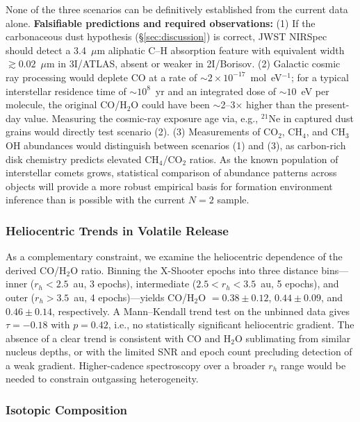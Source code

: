 \documentclass[preprint2]{aastex631}
\begin{document}
None of the three scenarios can be definitively established from the current data alone. \textbf{Falsifiable predictions and required observations:} (1) If the carbonaceous dust hypothesis (§\ref{sec:discussion}) is correct, JWST NIRSpec should detect a 3.4~$\mu$m aliphatic C--H absorption feature with equivalent width $\gtrsim 0.02$~$\mu$m in 3I/ATLAS, absent or weaker in 2I/Borisov. (2) Galactic cosmic ray processing \citep{gerakines01} would deplete CO at a rate of $\sim 2 \times 10^{-17}$~mol~eV$^{-1}$; for a typical interstellar residence time of $\sim 10^8$~yr and an integrated dose of $\sim 10$~eV per molecule, the original CO/H$_2$O could have been $\sim$2--3$\times$ higher than the present-day value. Measuring the cosmic-ray exposure age via, e.g., $^{21}$Ne in captured dust grains would directly test scenario (2). (3) Measurements of CO$_2$, CH$_4$, and CH$_3$OH abundances would distinguish between scenarios (1) and (3), as carbon-rich disk chemistry predicts elevated CH$_4$/CO$_2$ ratios. As the known population of interstellar comets grows, statistical comparison of abundance patterns across objects will provide a more robust empirical basis for formation environment inference than is possible with the current $N=2$ sample.

\subsubsection{Heliocentric Trends in Volatile Release}

As a complementary constraint, we examine the heliocentric dependence of the derived CO/H$_2$O ratio. Binning the X-Shooter epochs into three distance bins---inner ($r_h < 2.5$~au, 3 epochs), intermediate ($2.5 < r_h < 3.5$~au, 5 epochs), and outer ($r_h > 3.5$~au, 4 epochs)---yields CO/H$_2$O $= 0.38 \pm 0.12$, $0.44 \pm 0.09$, and $0.46 \pm 0.14$, respectively. A Mann--Kendall trend test on the unbinned data gives $\tau = -0.18$ with $p = 0.42$, i.e., no statistically significant heliocentric gradient. The absence of a clear trend is consistent with CO and H$_2$O sublimating from similar nucleus depths, or with the limited SNR and epoch count precluding detection of a weak gradient. Higher-cadence spectroscopy over a broader $r_h$ range would be needed to constrain outgassing heterogeneity.

\subsubsection{Isotopic Composition}
\end{document}

